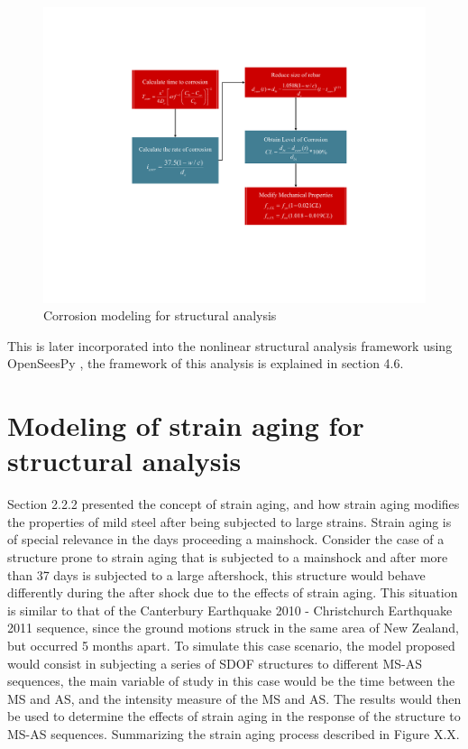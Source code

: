\begin{figure}[htbp]
	\centering
	\includegraphics[width=1\textwidth]{Chapter-4/figs/Corrosion_Modeling}
	\caption{Corrosion modeling for structural analysis}
	\label{fig:CorrModel}
\end{figure}

This is later incorporated into the nonlinear structural analysis framework using OpenSeesPy \cite{McKenna2010}\cite{Zhu2018}, the framework of this analysis is explained in section 4.6.

\section{Modeling of strain aging for structural analysis}
Section 2.2.2 presented the concept of strain aging, and how strain aging modifies the properties of mild steel after being subjected to large strains. Strain aging is of special relevance in the days proceeding a mainshock. Consider the case of a structure prone to strain aging that is subjected to a mainshock and after more than 37 days is subjected to a large aftershock, this structure would behave differently during the after shock due to the effects of strain aging. This situation is similar to that of the Canterbury Earthquake 2010 - Christchurch Earthquake 2011 sequence, since the ground motions struck in the same area of New Zealand, but occurred 5 months apart. To simulate this case scenario, the model proposed would consist in subjecting a series of SDOF structures to different MS-AS sequences, the main variable of study in this case would be the time between the MS and AS, and the intensity measure of the MS and AS. The results would then be used to determine the effects of strain aging in the response of the structure to MS-AS sequences. Summarizing the strain aging process described in Figure X.X. 

